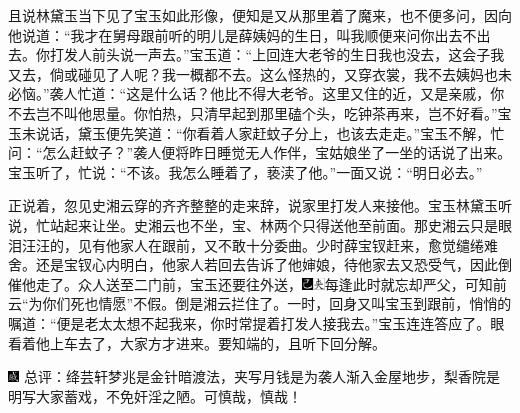且说林黛玉当下见了宝玉如此形像，便知是又从那里着了魔来，也不便多问，因向他说道：“我才在舅母跟前听的明儿是薛姨妈的生日，叫我顺便来问你出去不出去。你打发人前头说一声去。”宝玉道：“上回连大老爷的生日我也没去，这会子我又去，倘或碰见了人呢？我一概都不去。这么怪热的，又穿衣裳，我不去姨妈也未必恼。”袭人忙道：“这是什么话？他比不得大老爷。这里又住的近，又是亲戚，你不去岂不叫他思量。你怕热，只清早起到那里磕个头，吃钟茶再来，岂不好看。”宝玉未说话，黛玉便先笑道：“你看着人家赶蚊子分上，也该去走走。”宝玉不解，忙问：“怎么赶蚊子？”袭人便将昨日睡觉无人作伴，宝姑娘坐了一坐的话说了出来。宝玉听了，忙说：“不该。我怎么睡着了，亵渎了他。”一面又说：“明日必去。”

正说着，忽见史湘云穿的齐齐整整的走来辞，说家里打发人来接他。宝玉林黛玉听说，忙站起来让坐。史湘云也不坐，宝、林两个只得送他至前面。那史湘云只是眼泪汪汪的，见有他家人在跟前，又不敢十分委曲。少时薛宝钗赶来，愈觉缱绻难舍。还是宝钗心内明白，他家人若回去告诉了他婶娘，待他家去又恐受气，因此倒催他走了。众人送至二门前，宝玉还要往外送，{\includegraphics[width=3mm]{../Images/00003}\includegraphics[width=3mm]{../Images/00012}\footnotesize \kaishu 每逢此时就忘却严父，可知前云“为你们死也情愿”不假。}倒是湘云拦住了。一时，回身又叫宝玉到跟前，悄悄的嘱道：“便是老太太想不起我来，你时常提着打发人接我去。”宝玉连连答应了。眼看着他上车去了，大家方才进来。要知端的，且听下回分解。

{\includegraphics[width=3mm]{../Images/00005}  \kaishu 总评：绛芸轩梦兆是金针暗渡法，夹写月钱是为袭人渐入金屋地步，梨香院是明写大家蓄戏，不免奸淫之陋。可慎哉，慎哉！}
